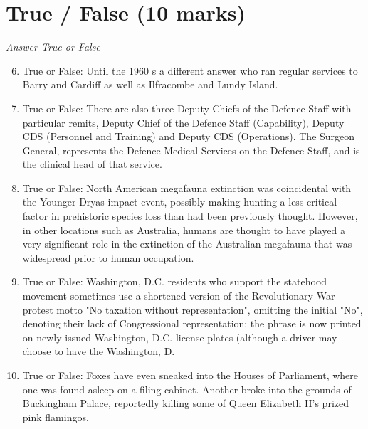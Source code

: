\documentclass[12pt]{article}
\begin{document}
\section*{True / False (10 marks)}
\textit{Answer True or False}
\begin{enumerate}[label=\arabic*.]
\setcounter{enumi}{5}
\item True or False: Until the 1960 s a different answer who ran regular services to Barry and Cardiff as well as Ilfracombe and Lundy Island.
\item True or False: There are also three Deputy Chiefs of the Defence Staff with particular remits, Deputy Chief of the Defence Staff (Capability), Deputy CDS (Personnel and Training) and Deputy CDS (Operations). The Surgeon General, represents the Defence Medical Services on the Defence Staff, and is the clinical head of that service.
\item True or False: North American megafauna extinction was coincidental with the Younger Dryas impact event, possibly making hunting a less critical factor in prehistoric species loss than had been previously thought. However, in other locations such as Australia, humans are thought to have played a very significant role in the extinction of the Australian megafauna that was widespread prior to human occupation.
\item True or False: Washington, D.C. residents who support the statehood movement sometimes use a shortened version of the Revolutionary War protest motto "No taxation without representation", omitting the initial "No", denoting their lack of Congressional representation; the phrase is now printed on newly issued Washington, D.C. license plates (although a driver may choose to have the Washington, D.
\item True or False: Foxes have even sneaked into the Houses of Parliament, where one was found asleep on a filing cabinet. Another broke into the grounds of Buckingham Palace, reportedly killing some of Queen Elizabeth II's prized pink flamingos.
\end{enumerate}
\end{document}
